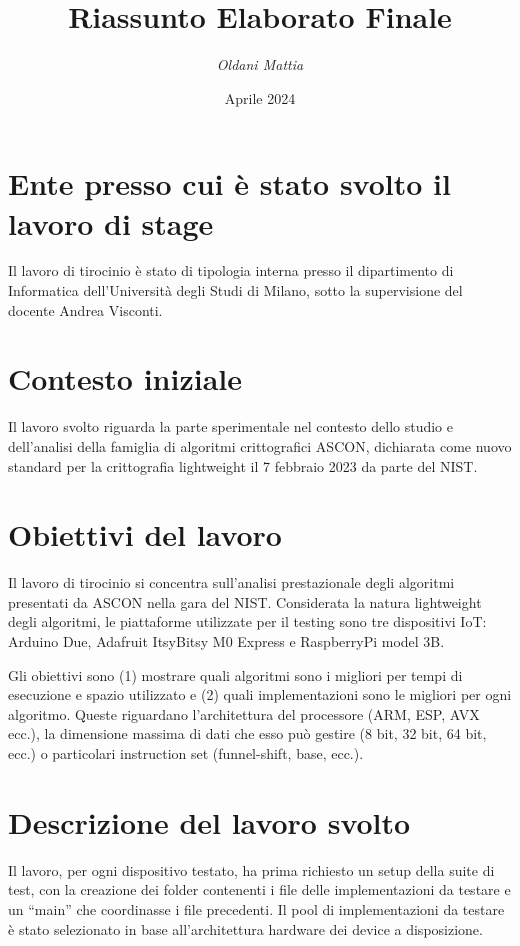 \documentclass[a4paper, 12pt, italian]{extarticle}
\title{\huge \bfseries Riassunto Elaborato Finale}
\author{\Large \textit{Oldani Mattia}}
\date{Aprile 2024}
\begin{document}
\maketitle

\section{Ente presso cui è stato svolto il lavoro di stage}

Il lavoro di tirocinio è stato di tipologia interna presso il dipartimento di Informatica dell'Università degli Studi di Milano, sotto la supervisione del docente Andrea Visconti.

\section{Contesto iniziale}

Il lavoro svolto riguarda la parte sperimentale nel contesto dello studio e dell'analisi della famiglia di algoritmi crittografici ASCON, dichiarata come nuovo standard per la crittografia lightweight il 7 febbraio 2023 da parte del NIST.

\section{Obiettivi del lavoro}

Il lavoro di tirocinio si concentra sull'analisi prestazionale degli algoritmi presentati da ASCON nella gara del NIST. Considerata la natura lightweight degli algoritmi, le piattaforme utilizzate per il testing sono tre dispositivi IoT: Arduino Due, Adafruit ItsyBitsy M0 Express e RaspberryPi model 3B. 

Gli obiettivi sono (1) mostrare quali algoritmi sono i migliori per tempi di esecuzione e spazio utilizzato e (2) quali implementazioni sono le migliori per ogni algoritmo. Queste riguardano l'architettura del processore (ARM, ESP, AVX ecc.), la dimensione massima di dati che esso può gestire (8 bit, 32 bit, 64 bit, ecc.) o particolari instruction set (funnel-shift, base, ecc.).

\section{Descrizione del lavoro svolto}

Il lavoro, per ogni dispositivo testato, ha prima richiesto un setup della suite di test, con la creazione dei folder contenenti i file delle implementazioni da testare e un ``main'' che coordinasse i file precedenti. Il pool di implementazioni da testare è stato selezionato in base all'architettura hardware dei device a disposizione.
\end{document}
